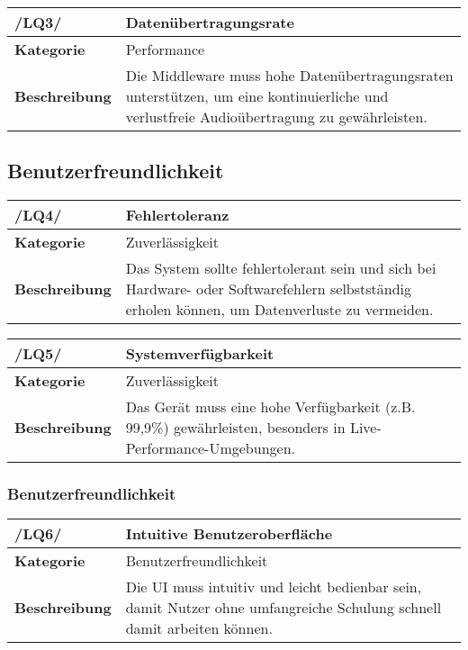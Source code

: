 \begin{table}[h!]
	\begin{tabularx}{\textwidth}{|l|X|}
		\hline
		\textbf{/LQ3/} & \textbf{Datenübertragungsrate} \\ \hline
		\textbf{Kategorie} & Performance \\ \hline
		\textbf{Beschreibung} & Die Middleware muss hohe Datenübertragungsraten unterstützen, um eine kontinuierliche und verlustfreie Audioübertragung zu gewährleisten. \\ \hline
	\end{tabularx}
\end{table}

\subsection{Benutzerfreundlichkeit}

\begin{table}[h!]
\begin{tabularx}{13cm}{|l|X|}
\hline
\textbf{/LQ4/} & \textbf{Fehlertoleranz} \\ \hline
\textbf{Kategorie} & Zuverlässigkeit \\ \hline
\textbf{Beschreibung} & Das System sollte fehlertolerant sein und sich bei Hardware- oder Softwarefehlern selbstständig erholen können, um Datenverluste zu vermeiden. \\ \hline
\end{tabularx}
\end{table}

\begin{table}[h!]
\begin{tabularx}{13cm}{|l|X|}
\hline
\textbf{/LQ5/} & \textbf{Systemverfügbarkeit} \\ \hline
\textbf{Kategorie} & Zuverlässigkeit \\ \hline
\textbf{Beschreibung} & Das Gerät muss eine hohe Verfügbarkeit (z.B. 99,9\%) gewährleisten, besonders in Live-Performance-Umgebungen. \\ \hline
\end{tabularx}
\end{table}

\newpage
\subsubsection{Benutzerfreundlichkeit}

\begin{table}[h!]
\begin{tabularx}{13cm}{|l|X|}
\hline
\textbf{/LQ6/} & \textbf{Intuitive Benutzeroberfläche} \\ \hline
\textbf{Kategorie} & Benutzerfreundlichkeit \\ \hline
\textbf{Beschreibung} & Die UI muss intuitiv und leicht bedienbar sein, damit Nutzer ohne umfangreiche Schulung schnell damit arbeiten können. \\ \hline
\end{tabularx}
\end{table}

